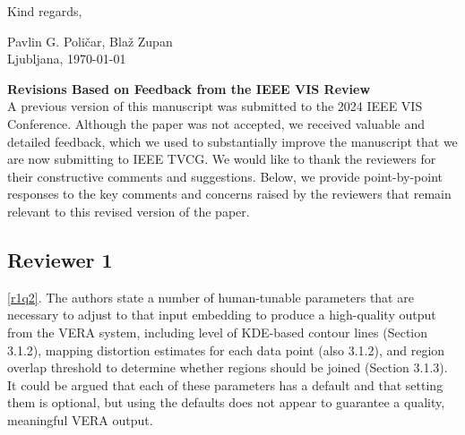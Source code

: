 \documentclass[11pt]{article}
\newcounter{rtaskno}
\newcommand{\rtask}[1]{\refstepcounter{rtaskno}\label{#1}}
\newcommand{\reviewc}[2]{\begin{leftbar}\noindent\rtask{#1}\ref{#1}. #2\end{leftbar}\vspace*{-4mm}}
\newcommand{\answer}[1]{\noindent #1\\[8mm]}
\newlength{\leftbarwidth}
\newlength{\leftbarsep}
\renewenvironment{leftbar}{%
    \def\FrameCommand{{\color{black}{\vrule width \leftbarwidth\relax\hspace {\leftbarsep}}}}%
    \MakeFramed {\advance \hsize -\width \FrameRestore }%
}{\endMakeFramed}
\begin{document}
\vspace{3mm}

\noindent Kind regards,
\vspace{3mm}

\noindent Pavlin G. Poli\v{c}ar,
Bla\v{z} Zupan \\ 
\noindent Ljubljana, \today

\newpage

{\bf Revisions Based on Feedback from the IEEE VIS Review} \\[5mm]

A previous version of this manuscript was submitted to the 2024 IEEE VIS Conference. Although the paper was not accepted, we received valuable and detailed feedback, which we used to substantially improve the manuscript that we are now submitting to IEEE TVCG. We would like to thank the reviewers for their constructive comments and suggestions. Below, we provide point-by-point responses to the key comments and concerns raised by the reviewers that remain relevant to this revised version of the paper.

\subsection*{Reviewer 1}




\reviewc{r1q2}{The authors state a number of human-tunable parameters that are necessary to adjust to that input embedding to produce a high-quality output from the VERA system, including level of KDE-based contour lines (Section 3.1.2), mapping distortion estimates for each data point (also 3.1.2), and region overlap threshold to determine whether regions should be joined (Section 3.1.3).  It could be argued that each of these parameters has a default and that setting them is optional, but using the defaults does not appear to guarantee a quality, meaningful VERA output.}
\end{document}
